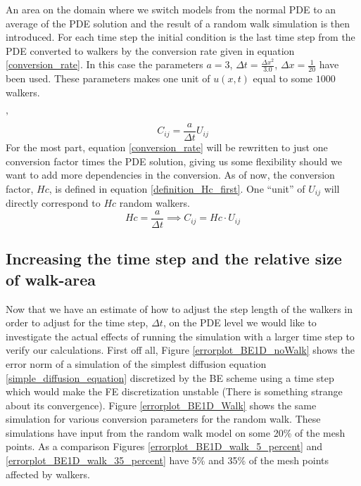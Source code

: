 
An area on the domain where we switch models from the normal PDE to an average of the PDE solution and the result of a random walk simulation is then introduced. For each time step the initial condition is the last time step from the PDE converted to walkers by the conversion rate given in equation \eqref{conversion_rate}.
In this case the parameters $a=3$, $\Delta t = \frac{\Delta x^2}{3.0}$, $\Delta x = \frac{1}{20}$ have been used. 
These parameters makes one unit of $u(x,t)$ equal to some $1000$ walkers. 

'\begin{equation}\label{conversion_rate}
 C_{ij} = \frac{a}{\Delta t}U_{ij}
\end{equation}
For the most part, equation \eqref{conversion_rate}  will be rewritten to just one conversion factor times the PDE solution, giving us some flexibility should we want to add more dependencies in the conversion. 
As of now, the conversion factor, $Hc$, is defined in equation \eqref{definition_Hc_first}. 
One ``unit'' of $ U_{ij}$ will directly correspond to $Hc$ random walkers.
\begin{equation}\label{definition_Hc_first}
 Hc =  \frac{a}{\Delta t} \implies C_{ij} = Hc\cdot U_{ij}
\end{equation}

\subsection{Increasing the time step and the relative size of walk-area}\label{increasing_dt}

Now that we have an estimate of how to adjust the step length of the walkers in order to adjust for the time step, $\Delta t$, on the PDE level we would like to investigate the actual effects of running the simulation with a larger time step to verify our calculations. 
First off all, Figure \ref{errorplot_BE1D_noWalk} shows the error norm of a simulation of the simplest diffusion equation \eqref{simple_diffusion_equation} discretized by the BE scheme using a time step which would make the FE discretization unstable (There is something strange about its convergence). 
Figure \ref{errorplot_BE1D_Walk} shows the same simulation for various conversion parameters for the random walk. 
These simulations have input from the random walk model on some 20\% of the mesh points. 
As a comparison Figures \ref{errorplot_BE1D_walk_5_percent} and \ref{errorplot_BE1D_walk_35_percent} have 5\% and 35\% of the mesh points affected by walkers.

